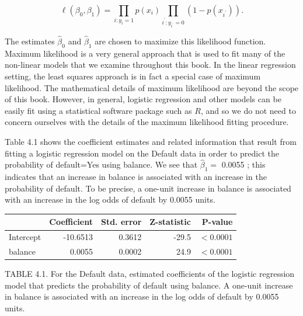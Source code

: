 \documentclass[10pt]{article}
\begin{document}
\begin{equation*}
\ell\left(\beta_{0}, \beta_{1}\right)=\prod_{i: y_{i}=1} p\left(x_{i}\right) \prod_{i^{\prime}: y_{i^{\prime}}=0}\left(1-p\left(x_{i^{\prime}}\right)\right) . \tag{4.5}
\end{equation*}


The estimates $\hat{\beta}_{0}$ and $\hat{\beta}_{1}$ are chosen to maximize this likelihood function.\\
Maximum likelihood is a very general approach that is used to fit many of the non-linear models that we examine throughout this book. In the linear regression setting, the least squares approach is in fact a special case of maximum likelihood. The mathematical details of maximum likelihood are beyond the scope of this book. However, in general, logistic regression and other models can be easily fit using a statistical software package such as $R$, and so we do not need to concern ourselves with the details of the maximum likelihood fitting procedure.

Table 4.1 shows the coefficient estimates and related information that result from fitting a logistic regression model on the Default data in order to predict the probability of default=Yes using balance. We see that $\hat{\beta}_{1}=$ 0.0055 ; this indicates that an increase in balance is associated with an increase in the probability of default. To be precise, a one-unit increase in balance is associated with an increase in the log odds of default by 0.0055 units.

\begin{center}
\begin{tabular}{l|rrrr}
\hline
 & Coefficient & Std. error & Z-statistic & P-value \\
\hline
Intercept & -10.6513 & 0.3612 & -29.5 & $<0.0001$ \\
balance & 0.0055 & 0.0002 & 24.9 & $<0.0001$ \\
\hline
\end{tabular}
\end{center}

TABLE 4.1. For the Default data, estimated coefficients of the logistic regression model that predicts the probability of default using balance. A one-unit increase in balance is associated with an increase in the log odds of default by 0.0055 units.
\end{document}
